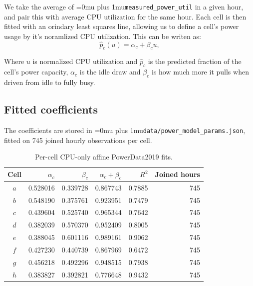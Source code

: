 \documentclass[12pt]{article}
\newcommand{\codepath}[1]{{\Urlmuskip=0mu plus 1mu\relax\nolinkurl{#1}}}
\begin{document}
We take the average of \codepath{measured_power_util} in a given hour, and pair this with average CPU utilization for the same hour. Each cell is then fitted with an orindary least squares line, allowing us to define a cell's power usage by it's noramlized CPU utilization. This can be writen as:
\begin{equation}
  \widehat{p}_{c}(u)
  =
  \alpha_c + \beta_c u,
  \label{eq:powerdata-affine-fit}
\end{equation}

Where \(u\) is normalized CPU utilization and \(\widehat{p}_c\) is the predicted fraction of the cell's power capacity, \(\alpha_c\) is the idle draw and \(\beta_c\) is how much more it pulls when driven from idle to fully busy. 

\subsection{Fitted coefficients}
\label{subsec:powerdata-coefficients}

The coefficients are stored in \codepath{data/power_model_params.json}, fitted on 745 joined hourly observations per cell.

\begin{table}[htbp]
  \centering
  \small
  \caption{Per-cell CPU-only affine PowerData2019 fits.}
  \label{tab:powerdata-coefficients}
  \begin{tabular}{@{}crrrrr@{}}
    \toprule
    Cell & \(\alpha_c\) & \(\beta_c\) & \(\alpha_c+\beta_c\)
         & \(R^2\) & Joined hours \\
    \midrule
    \(a\) & 0.528016 & 0.339728 & 0.867743 & 0.7885 & 745 \\
    \(b\) & 0.548190 & 0.375761 & 0.923951 & 0.7479 & 745 \\
    \(c\) & 0.439604 & 0.525740 & 0.965344 & 0.7642 & 745 \\
    \(d\) & 0.382039 & 0.570370 & 0.952409 & 0.8005 & 745 \\
    \(e\) & 0.388045 & 0.601116 & 0.989161 & 0.9062 & 745 \\
    \(f\) & 0.427230 & 0.440739 & 0.867969 & 0.6472 & 745 \\
    \(g\) & 0.456218 & 0.492296 & 0.948515 & 0.7938 & 745 \\
    \(h\) & 0.383827 & 0.392821 & 0.776648 & 0.9432 & 745 \\
    \bottomrule
  \end{tabular}
\end{table}
\end{document}

